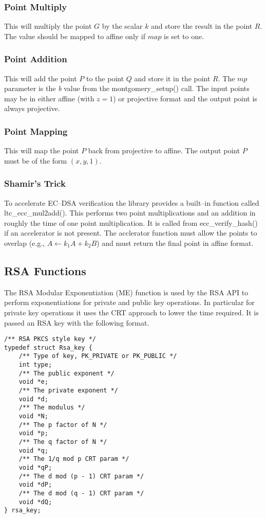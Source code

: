 \documentclass[synpaper]{book}
\begin{document}
\subsubsection{Point Multiply}
This will multiply the point $G$ by the scalar $k$ and store the result in the point $R$.  The value should be mapped to affine only if $map$ is set to one.

\subsubsection{Point Addition}
This will add the point $P$ to the point $Q$ and store it in the point $R$.  The $mp$ parameter is the \textit{b} value from the montgomery\_setup() call.  The input points
may be in either affine (with $z = 1$) or projective format and the output point is always projective.

\subsubsection{Point Mapping}
This will map the point $P$ back from projective to affine.  The output point $P$ must be of the form $(x, y, 1)$.

\subsubsection{Shamir's Trick}
To accelerate EC--DSA verification the library provides a built--in function called ltc\_ecc\_mul2add().  This performs two point multiplications and an addition in
roughly the time of one point multiplication.  It is called from ecc\_verify\_hash() if an accelerator is not present.  The acclerator function must allow the points to
overlap (e.g., $A \leftarrow k_1A + k_2B$) and must return the final point in affine format.


\subsection{RSA Functions}
The RSA Modular Exponentiation (ME) function is used by the RSA API to perform exponentiations for private and public key operations.  In particular for
private key operations it uses the CRT approach to lower the time required.  It is passed an RSA key with the following format.

\begin{verbatim}
/** RSA PKCS style key */
typedef struct Rsa_key {
    /** Type of key, PK_PRIVATE or PK_PUBLIC */
    int type;
    /** The public exponent */
    void *e;
    /** The private exponent */
    void *d;
    /** The modulus */
    void *N;
    /** The p factor of N */
    void *p;
    /** The q factor of N */
    void *q;
    /** The 1/q mod p CRT param */
    void *qP;
    /** The d mod (p - 1) CRT param */
    void *dP;
    /** The d mod (q - 1) CRT param */
    void *dQ;
} rsa_key;
\end{verbatim}
\end{document}
